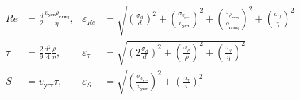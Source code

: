 \documentclass[a4paper, 12pt]{article}
\begin{document}
    \begin{align}
        Re &= \frac{d}{2} \frac{v_{уст} \rho_{глиц}}{\eta}, & \varepsilon_{Re} &= \sqrt{\left( \frac{\sigma_d}{d} \right)^2 + \left( \frac{\sigma_{v_{уст}}}{v_{уст}} \right)^2 + \left( \frac{\sigma_{\rho_{глиц}}}{\rho_{глиц}} \right)^2 + \left( \frac{\sigma_{\eta}}{\eta} \right)^2}\label{Re}\\
        \tau &= \frac{2}{9} \frac{d^2}{4} \frac{\rho}{\eta}, & \varepsilon_{\tau} &= \sqrt{\left( 2\frac{\sigma_d}{d} \right)^2  + \left( \frac{\sigma_{\rho}}{\rho} \right)^2 + \left( \frac{\sigma_{\eta}}{\eta} \right)^2}\label{relax_time}\\
        S &= v_{уст} \tau, & \varepsilon_S &= \sqrt{\left( \frac{\sigma_{v_{уст}}}{v_{уст}} \right)^2  + \left( \frac{\sigma_{\tau}}{\tau} \right)^2}\label{S}
    \end{align}
\end{document}
